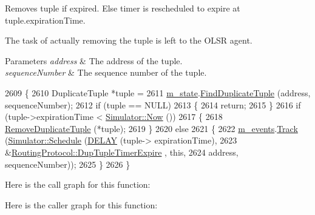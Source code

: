 Removes tuple if expired. Else timer is rescheduled to expire at tuple.\+expiration\+Time. 

The task of actually removing the tuple is left to the O\+L\+SR agent.


\begin{DoxyParams}{Parameters}
{\em address} & The address of the tuple. \\
\hline
{\em sequence\+Number} & The sequence number of the tuple. \\
\hline
\end{DoxyParams}

\begin{DoxyCode}
2609 \{
2610   DuplicateTuple *tuple =
2611     \hyperlink{classns3_1_1olsr_1_1RoutingProtocol_a07942ec1a7df71b609c8d2ff3b567c49}{m\_state}.\hyperlink{classns3_1_1olsr_1_1OlsrState_ab00d5bb24a075329d19cf44af31524d1}{FindDuplicateTuple} (address, sequenceNumber);
2612   \textcolor{keywordflow}{if} (tuple == NULL)
2613     \{
2614       \textcolor{keywordflow}{return};
2615     \}
2616   \textcolor{keywordflow}{if} (tuple->expirationTime < \hyperlink{classns3_1_1Simulator_ac3178fa975b419f7875e7105be122800}{Simulator::Now} ())
2617     \{
2618       \hyperlink{classns3_1_1olsr_1_1RoutingProtocol_a72a3220cc44a4fadc7156bfc2603e547}{RemoveDuplicateTuple} (*tuple);
2619     \}
2620   \textcolor{keywordflow}{else}
2621     \{
2622       \hyperlink{classns3_1_1olsr_1_1RoutingProtocol_a80368d3da46150cf3fc9139c40f33d53}{m\_events}.\hyperlink{classns3_1_1EventGarbageCollector_a4f26a1f6e9a09e648eb31b46acd85144}{Track} (\hyperlink{classns3_1_1Simulator_a671882c894a08af4a5e91181bf1eec13}{Simulator::Schedule} (\hyperlink{olsr-routing-protocol_8cc_ad0a00c3386c4a24278b3b710ae798220}{DELAY} (tuple->
      expirationTime),
2623                                            &\hyperlink{classns3_1_1olsr_1_1RoutingProtocol_a78f4aad4a5597ab60fa913e917eabbec}{RoutingProtocol::DupTupleTimerExpire}
      , \textcolor{keyword}{this},
2624                                            address, sequenceNumber));
2625     \}
2626 \}
\end{DoxyCode}


Here is the call graph for this function\+:




Here is the caller graph for this function\+:


